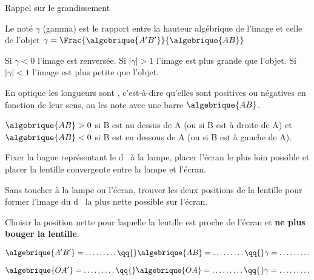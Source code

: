\begin{doc}{Rappel sur le grandissement}
  \label{doc:rappel_grandissement}
  \vspace*{-24pt}
  \begin{encart}
    Le  noté $\gamma$ (gamma) est le rapport entre la hauteur algébrique de l'image et celle de l'objet
    $\gamma = \Frac{\algebrique{A'B'}}{\algebrique{AB}}$
  \end{encart}
  Si $\gamma < 0$ l'image est renversée.
  Si $|\gamma| > 1$ l'image est plus grande que l'objet. 
  Si $|\gamma| < 1$ l'image est plus petite que l'objet.
  
  \begin{encart}
    En optique les longueurs sont , c'est-à-dire qu'elles sont positives ou négatives en fonction de leur sens, on les note avec une barre $\algebrique{AB}$.
  \end{encart}
  \exemple $\algebrique{AB} > 0$ si B est au dessus de A (ou si B est à droite de A) et $\algebrique{AB} < 0$ si B est en dessous de A (ou si B est à gauche de A).
\end{doc}
\bigskip


\mesure
Fixer la bague représentant le \og d \fg\, à la lampe, placer l’écran le plus loin possible et placer la lentille convergente entre la lampe et l’écran.

Sans toucher à la lampe ou l'écran, trouver les deux positions de la lentille pour former l’image du \og d \fg\, la plus nette possible sur l’écran.
  
Choisir la position nette pour laquelle la lentille est proche de l’écran et \textbf{ne plus bouger la lentille}.


\vspace*{-8pt}
\begin{equation*}
  \algebrique{A'B'} = \ldots \ldots \ldots
  \qq{}
  \algebrique{AB} = \ldots \ldots \ldots
  \qq{}
  \gamma = \ldots \ldots \ldots
\end{equation*}



\vspace*{-8pt}
\begin{equation*}
  \algebrique{OA'} = \ldots \ldots \ldots
  \qq{}
  \algebrique{OA} = \ldots \ldots \ldots
  \qq{}
  \gamma = \ldots \ldots \ldots
\end{equation*}


